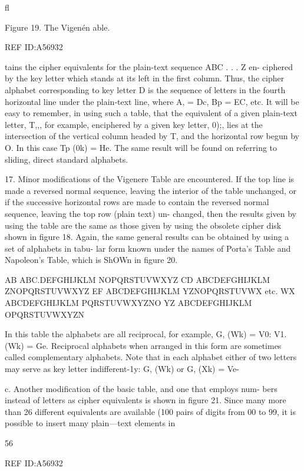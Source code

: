 {{{ﬂ

Figure 19. The Vigenén able.

 

REF ID:A56932

tains the cipher equivalents for the plain-text sequence ABC . . . Z en-
ciphered by the key letter which stands at its left in the ﬁrst column.
Thus, the cipher alphabet corresponding to key letter D is the sequence
of letters in the fourth horizontal line under the plain-text line, where
A, = Dc, Bp = EC, etc. It will be easy to remember, in using such a
table, that the equivalent of a given plain-text letter, T,,, for example,
enciphered by a given key letter, 0);, lies at the intersection of the vertical
column headed by T, and the horizontal row begun by O. In this case
Tp (0k) = He. The same result will be found on referring to sliding,
direct standard alphabets.

17. Minor modiﬁcations of the Vigenere Table are encountered. If the
top line is made a reversed normal sequence, leaving the interior of the
table unchanged, or if the successive horizontal rows are made to contain
the reversed normal sequence, leaving the top row (plain text) un-
changed, then the results given by using the table are the same as those
given by using the obsolete cipher disk shown in ﬁgure 18. Again, the
same general results can be obtained by using a set of alphabets in tabu-
lar form known under the names of Porta’s Table and Napoleon’s Table,
which is ShOWn in ﬁgure 20.

AB ABC.DEFGHIJKLM
NOPQRSTUVWXYZ
CD ABCDEFGHIJKLM
ZNOPQRSTUVWXYZ
EF ABCDEFGHIJKLM
YZNOPQRSTUVWX
etc.
WX ABCDEFGHIJKLM
PQRSTUVWXYZNO
YZ ABCDEFGHIJKLM
OPQRSTUVWXYZN

In this table the alphabets are all reciprocal, for example, G, (Wk) = V0:
V1. (Wk) = Ge. Reciprocal alphabets when arranged in this form are
sometimes called complementary alphabets. Note that in each alphabet
either of two letters may serve as key letter indifferent-1y: G, (Wk) or
G, (Xk) = Ve-

c. Another modiﬁcation of the basic table, and one that employs num-
bers instead of letters as cipher equivalents is shown in ﬁgure 21. Since
many more than 26 different equivalents are available (100 pairs of
digits from 00 to 99, it is possible to insert many plain—text elements in

56

 

REF ID:A56932

 

}}}

